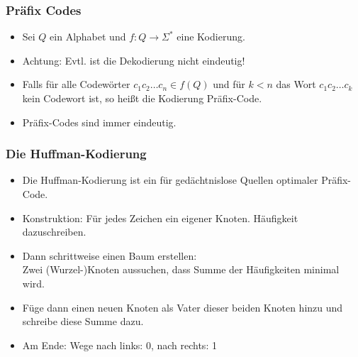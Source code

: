 \documentclass{beamer}
\newcommand{\F}{\Sigma^*}
\begin{document}
\begin{frame}
\frametitle{Präfix Codes}
\begin{itemize}
\item Sei $Q$ ein Alphabet und $f:Q\to \F$ eine Kodierung.\pause
\item Achtung: Evtl. ist die Dekodierung nicht eindeutig!\pause
\item Falls für alle Codewörter $c_1c_2\ldots c_n\in f(Q)$ und für $k<n$ das Wort $c_1c_2\ldots c_k$ kein Codewort ist, so heißt die Kodierung Präfix-Code.
\item Präfix-Codes sind immer eindeutig.
\end{itemize}
\end{frame}

\begin{frame}
\frametitle{Die Huffman-Kodierung}
\begin{itemize}
\item Die Huffman-Kodierung ist ein für gedächtnislose Quellen optimaler Präfix-Code.
\vspace{1cm}\pause
\item Konstruktion: Für jedes Zeichen ein eigener Knoten. Häufigkeit dazuschreiben.\pause
\item Dann schrittweise einen Baum erstellen:\\
Zwei (Wurzel-)Knoten aussuchen, dass Summe der Häufigkeiten minimal wird.
\item Füge dann einen neuen Knoten als Vater dieser beiden Knoten hinzu und schreibe diese Summe dazu.\pause
\item Am Ende: Wege nach links: 0, nach rechts: 1
\end{itemize}
\end{frame}
\end{document}

